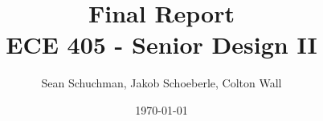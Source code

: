 \documentclass{article}
\title{
    \textbf{Final Report}\\
    \vspace{1cm}
    ECE 405 - Senior Design II
}
\author{Sean Schuchman, Jakob Schoeberle, Colton Wall}
\date{\today}
\begin{document}
\graphicspath{{./images/}}

\maketitle



\tableofcontents
\newpage

% 
\end{document}

